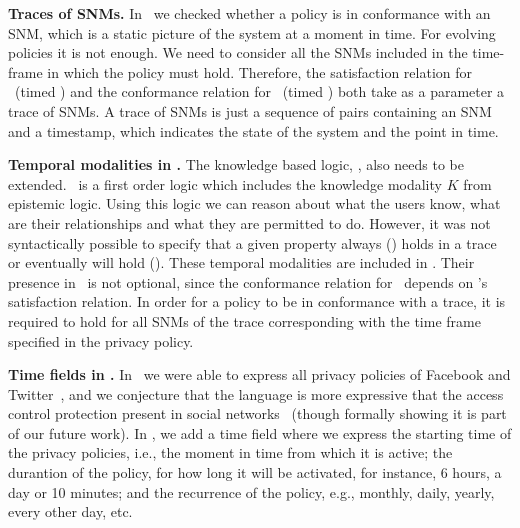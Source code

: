 \begin{inparaenum}[]
\item \textbf{Traces of SNMs.} In \fppf~we checked whether a policy is in conformance with an SNM, which is a static picture of the system at a moment in time. For evolving policies it is not enough. We need to consider all the SNMs included in the time-frame in which the policy must hold. Therefore, the satisfaction relation for \tkbl~(timed \kbl) and the conformance relation for \tppl~(timed \ppl) both take as a parameter a trace of SNMs. A trace of SNMs is just a sequence of pairs containing an SNM and a timestamp, which indicates the state of the system and the point in time.
  
\item \textbf{Temporal modalities in \tkbl.} The knowledge based logic, \kbl, also needs to be extended. \kbl~is a first order logic which includes the knowledge modality $K$ from epistemic logic. Using this logic we can reason about what the users know, what are their relationships and what they are permitted to do. However, it was not syntactically possible to specify that a given property always (\al) holds in a trace or eventually will hold (\ev). These temporal modalities are included in \tkbl. Their presence in \tkbl~is not optional, since the conformance relation for \tppl~depends on \tkbl's satisfaction relation. In order for a policy to be in conformance with a trace, it is required to hold for all SNMs of the trace corresponding with the time frame specified in the privacy policy.
  
\item \textbf{Time fields in \tppl.} In \ppl~we were able to express all privacy policies of Facebook and Twitter~\cite{PS14fpp}, and we conjecture that the language is more expressive that the access control protection present in social networks~\cite{BFS+12rbaceehl,F11rbacppl} (though formally showing it is part of our future work). In \tppl, we add a time field where we express the starting time of the privacy policies, i.e., the moment in time from which it is active; the durantion of the policy, for how long it will be activated, for instance, 6 hours, a day or 10 minutes; and the recurrence of the policy, e.g., monthly, daily, yearly, every other day, etc.

\end{inparaenum}

